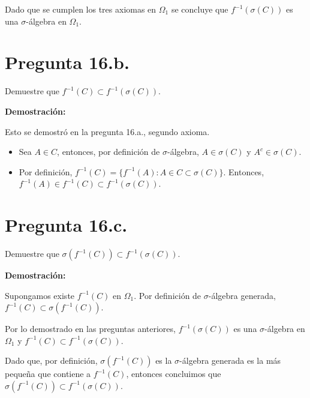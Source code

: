 \documentclass[11pt]{article}
\begin{document}
Dado que se cumplen los tres axiomas en $\Omega_{1}$ se concluye que $\mathit{f}^{-1} (\sigma(C))$ es una $\sigma$-álgebra en $\Omega_{1}$.

\section{Pregunta 16.b.}

Demuestre que $\mathit{f}^{-1} (C) \subset \mathit{f}^{-1} (\sigma(C))$.

\textbf{Demostración:}

Esto se demostró en la pregunta 16.a., segundo axioma.

\begin{itemize}
	\item Sea $ A \in C$, entonces, por definición de $\sigma$-álgebra, $\mathit{A} \in \sigma(C)$ y $\mathit{A}^{c} \in \sigma(C)$.
	\item Por definición, $\mathit{f}^{-1} (C) = \{\mathit{f}^{-1} (A): A \in C \subset \sigma(C) \}$. Entonces, $\mathit{f}^{-1}(A) \in \mathit{f}^{-1}(C) \subset \mathit{f}^{-1}(\sigma(C))$.
\end{itemize}


\section{Pregunta 16.c.}

Demuestre que $\sigma(\mathit{f}^{-1}(C)) \subset \mathit{f}^{-1}(\sigma(C))$.

\textbf{Demostración:}

Supongamos existe $\mathit{f}^{-1}(C)$ en $\Omega_{1}$. Por definición de $\sigma$-álgebra generada,  $\mathit{f}^{-1}(C) \subset \sigma(\mathit{f}^{-1}(C))$.

Por lo demostrado en las preguntas anteriores, $\mathit{f}^{-1} (\sigma(C))$ es una $\sigma$-álgebra en $\Omega_{1}$ y $\mathit{f}^{-1} (C) \subset \mathit{f}^{-1} (\sigma(C))$.

Dado que, por definición, $\sigma(\mathit{f}^{-1}(C))$ es la $\sigma$-álgebra generada es la más pequeña que contiene a $\mathit{f}^{-1}(C)$, entonces concluimos que $\sigma(\mathit{f}^{-1}(C)) \subset \mathit{f}^{-1}(\sigma(C))$.
\end{document}
